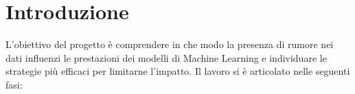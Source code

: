 \documentclass[12pt]{article}
\begin{document}
\newcommand{\imgplaceholder}[3]{%
\begin{figure}[H]
    \centering
    \fboxsep=10pt
    \fbox{%
        \begin{minipage}{0.85\textwidth}
            \centering
            \vspace{1.7cm}
            {\large \bfseries [INSERIRE QUI IMMAGINE MANUALMENTE]}\\[0.5cm]
            \textit{#1}\\[0.3cm]
            {\small \texttt{Nome file suggerito: #3}}
            \vspace{1.7cm}
        \end{minipage}%
    }
    \caption{#2}
\end{figure}
}



\tableofcontents
\newpage

\section{Introduzione}

L'obiettivo del progetto è comprendere in che modo la presenza di rumore nei dati influenzi le prestazioni dei modelli di Machine Learning e individuare le strategie più efficaci per limitarne l'impatto. Il lavoro si è articolato nelle seguenti fasi:
\end{document}
